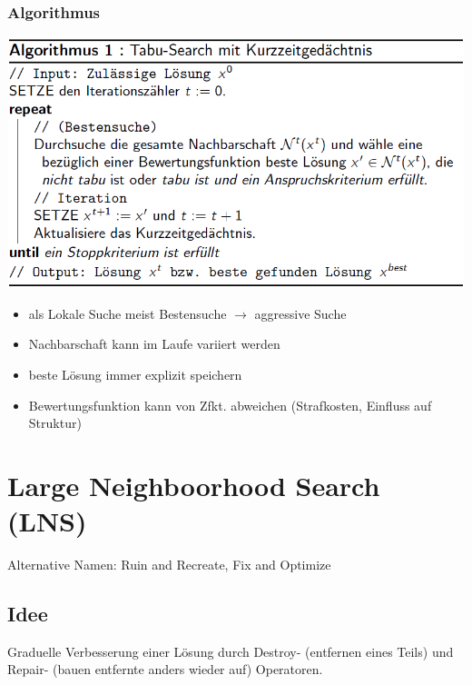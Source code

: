 \documentclass[12pt]{article}
\begin{document}
			\subsubsection{Algorithmus}
				\includegraphics[scale=0.6]{TabuSearch}	
				\begin{itemize}
					\item als Lokale Suche meist Bestensuche $\rightarrow$ aggressive Suche
					\item Nachbarschaft kann im Laufe variiert werden
					\item beste Lösung immer explizit speichern
					\item Bewertungsfunktion kann von Zfkt. abweichen (Strafkosten, Einfluss auf Struktur)
				\end{itemize}
				
	\section{Large Neighboorhood Search (LNS)}
		Alternative Namen: Ruin and Recreate, Fix and Optimize
		\subsection{Idee}
			Graduelle Verbesserung einer Lösung durch Destroy- (entfernen eines Teils) und Repair- (bauen entfernte anders wieder auf) Operatoren.
			
\end{document}
